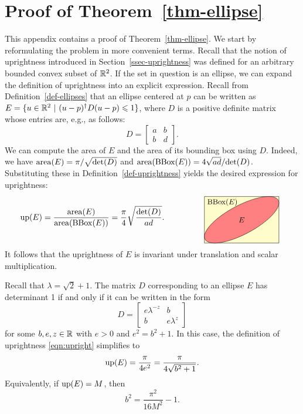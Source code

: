 
\section[Proof of Theorem 5.16]{Proof of Theorem~\ref{thm-ellipse}}
\label{appendix-skew-red}

This appendix contains a proof of Theorem~\ref{thm-ellipse}. We start
by reformulating the problem in more convenient terms. Recall that the
notion of uprightness introduced in Section~\ref{ssec-uprightness} was
defined for an arbitrary bounded convex subset of ${\mathbb{R}}^2$. If the set
in question is an ellipse, we can expand the definition of uprightness
into an explicit expression. Recall from Definition~\ref{def-ellipses}
that an ellipse centered at $p$ can be written as $E=\{u\in{\mathbb{R}}^2~|~
  (u-p)^\dagger D(u-p)\leqslant 1\}$, where $D$ is a positive definite matrix
whose entries are, e.g., as follows:
\[
  D = 
  \left[ 
    \begin{array}{cc} 
      a & b  \\
      b & d
    \end{array} 
  \right].
\]
We can compute the area of $E$ and the area of its 
bounding box using $D$. Indeed, we have 
$\mathop{\rm area}\nolimits(E)= \pi/\sqrt{\mbox{det}(D)}$ and 
$\mathop{\rm area}\nolimits (\mathop{{\rm BBox}}\nolimits(E))=4\sqrt{ad} /\mbox{det}(D)$. 
Substituting these in Definition~\ref{def-uprightness} 
yields the desired expression for uprightness:
\begin{equation}
\label{eqn:upright}
  \up(E) = \frac{\area(E)}
                {\area(\BBox(E))}
         = \frac{\pi}{4} 
             \sqrt{
               \frac{\Det(D)}{ad} 
             }.
    {\hspace{1.5cm}
    \begin{tikzpicture}[baseline=0, xscale=1.6, yscale=1]
      \draw[fill=yellow!20] (-1,-1) -- (1,-1) -- (1,1) -- (-1,1) -- cycle;
      \draw[fill=red!50, rotate=45, yscale=0.4] (0,0) circle (1.3131);
      \draw (0,0) node {\small $E$};
      \draw (-1,.75) node[right] {\small $\BBox(E)$};
    \end{tikzpicture}
    }
\end{equation}
It follows that the uprightness of $E$ is invariant under 
translation and scalar multiplication.

Recall that $\lambda=\sqrt{2} +1$. The matrix $D$ corresponding to 
an ellipse $E$ has determinant 1 if and only if it can be written 
in the form
\begin{equation}
  D =
  \left[ 
    \begin{array} {cc} 
      e{\lambda^{-z}} & b \\
      b & e{\lambda^{z}}
    \end{array} 
  \right]
\end{equation}
for some $b,e,z\in{\mathbb{R}}$ with $e>0$ and $e^2=b^2+1$.  In this case, the
definition of uprightness {\eqref{eqn:upright}} simplifies to
\begin{equation}\label{eqn-upe}
  \mathop{\rm up}\nolimits(E) = \frac{\pi}{4e^2} = \frac{\pi}{4\sqrt{b^2+1}}.
\end{equation}
Equivalently, if $\mathop{\rm up}\nolimits(E)=M$, then
\begin{equation}\label{eqn-b2}
  b^2 = \frac{\pi^2}{16M^2} - 1.
\end{equation}

